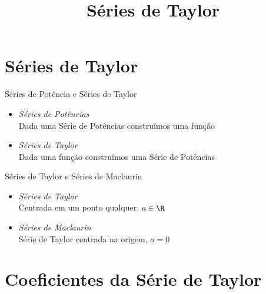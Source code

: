 
\usepackage{integracao_e_series}

\title{Séries de Taylor}



\addtitle

\section{Séries de Taylor}

\begin{frame}{Séries de Potência e Séries de Taylor}
  \begin{itemize}[<+->]
    \item \emph{Séries de Potências}                          \\[3mm]
          Dada uma Série de Potências construímos uma função  \\[11mm]
    \item \emph{Séries de Taylor}                             \\[3mm]
          Dada uma função construímos uma Série de Potências
  \end{itemize}
\end{frame}

\begin{frame}{Séries de Taylor e Séries de Maclaurin}
  \begin{itemize}[<+->]
    \item \emph{Séries de Taylor}                     \\[3mm]
    Centrada em um ponto qualquer, \emph{$a\in\R$}    \\[11mm]
    \item \emph{Séries de Maclaurin}                  \\[3mm]
    Série de Taylor centrada na origem, \emph{$a=0$}
  \end{itemize}
\end{frame}

\section{Coeficientes da Série de Taylor}

